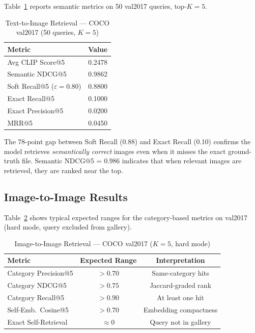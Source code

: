 \documentclass[conference]{IEEEtran}
\begin{document}
Table~\ref{tab:t2i} reports semantic metrics on 50 val2017 queries,
top-$K\!=\!5$.

\begin{table}[t]
\centering\small
\caption{Text-to-Image Retrieval — COCO val2017 (50 queries, $K\!=\!5$)}
\label{tab:t2i}
\begin{tabular}{lc}
\toprule
Metric & Value \\ \midrule
Avg CLIP Score@5    & 0.2478 \\
Semantic NDCG@5     & 0.9862 \\
Soft Recall@5 ($\varepsilon\!=\!0.80$) & 0.8800 \\
Exact Recall@5      & 0.1000 \\
Exact Precision@5   & 0.0200 \\
MRR@5               & 0.0450 \\
\bottomrule
\end{tabular}
\end{table}

The 78-point gap between Soft Recall (0.88) and Exact Recall (0.10)
confirms the model retrieves \emph{semantically correct} images even
when it misses the exact ground-truth file.
Semantic NDCG@5 = 0.986 indicates that when relevant images are
retrieved, they are ranked near the top.

\subsection{Image-to-Image Results}
Table~\ref{tab:i2i} shows typical expected ranges for the category-based
metrics on val2017 (hard mode, query excluded from gallery).

\begin{table}[t]
\centering\small
\caption{Image-to-Image Retrieval — COCO val2017 ($K\!=\!5$, hard mode)}
\label{tab:i2i}
\begin{tabular}{lcc}
\toprule
Metric & Expected Range & Interpretation \\ \midrule
Category Precision@5    & $>0.70$ & Same-category hits \\
Category NDCG@5         & $>0.75$ & Jaccard-graded rank \\
Category Recall@5       & $>0.90$ & At least one hit \\
Self-Emb.\ Cosine@5     & $>0.70$ & Embedding compactness \\
Exact Self-Retrieval    & $\approx0$ & Query not in gallery \\
\bottomrule
\end{tabular}
\end{table}
\end{document}
